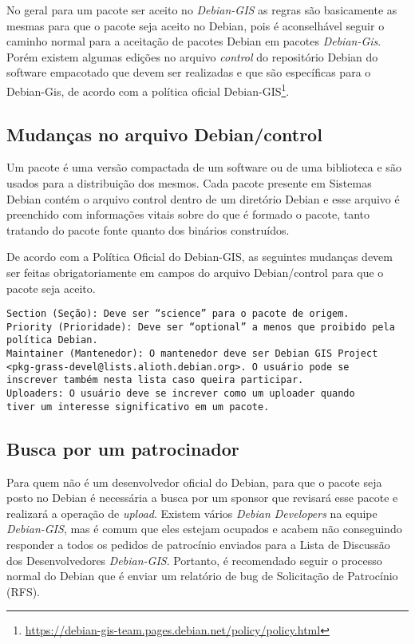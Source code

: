 No geral para um pacote ser aceito no \textit{Debian-GIS} as regras são basicamente as mesmas para que o pacote seja aceito no Debian, pois é aconselhável seguir o caminho normal para a aceitação de pacotes Debian em pacotes \textit{Debian-Gis}. Porém existem algumas edições no arquivo \textit{control} do repositório Debian do software empacotado que devem ser realizadas e que são específicas para o Debian-Gis, de acordo com a política oficial Debian-GIS\footnote{ \url{https://debian-gis-team.pages.debian.net/policy/policy.html}}.

\subsection{Mudanças no arquivo Debian/control}
Um pacote é uma versão compactada de um software ou de uma biblioteca e são usados para a distribuição dos mesmos. Cada pacote presente em Sistemas Debian contém o arquivo control dentro de um diretório Debian e esse arquivo é preenchido com informações vitais sobre do que é formado o pacote, tanto tratando do pacote fonte quanto dos binários construídos.

De acordo com a Política Oficial do Debian-GIS, as seguintes mudanças devem ser feitas obrigatoriamente em campos do arquivo Debian/control para que o pacote seja aceito. 

\begin{verbatim}
Section (Seção): Deve ser “science” para o pacote de origem.
Priority (Prioridade): Deve ser “optional” a menos que proibido pela
política Debian.
Maintainer (Mantenedor): O mantenedor deve ser Debian GIS Project
<pkg-grass-devel@lists.alioth.debian.org>. O usuário pode se
inscrever também nesta lista caso queira participar.
Uploaders: O usuário deve se increver como um uploader quando
tiver um interesse significativo em um pacote.
\end{verbatim}

\subsection{Busca por um patrocinador}

Para quem não é um desenvolvedor oficial do Debian, para que o pacote seja posto no Debian é necessária a busca por um sponsor que revisará esse pacote e realizará a operação de \textit{upload}. Existem vários \textit{Debian Developers} na equipe \textit{Debian-GIS}, mas é comum que eles estejam ocupados e acabem não conseguindo responder a todos os pedidos de patrocínio enviados para a Lista de Discussão dos Desenvolvedores \textit{Debian-GIS}. Portanto, é recomendado seguir o processo normal do Debian que é enviar um relatório de bug de Solicitação de Patrocínio (RFS). 

